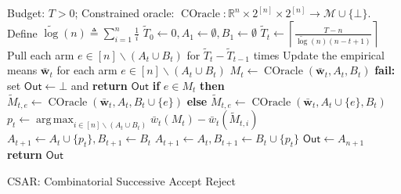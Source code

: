 \documentclass{article}
\newcommand{\AlgorithmBud}{{\small \textsf{CSAR}}\xspace}
\newcommand{\M}{\mathcal M}
\newcommand{\del}{\backslash}
\newcommand{\RR}{\mathbb R}
\DeclareMathOperator*{\argmax}{arg\,max}
\DeclareMathOperator{\COracle}{COracle}
\newcommand{\out}{\mathsf{Out}}
\newcommand{\barlog}{\tilde{\log}}
\renewcommand{\vec}[1]{\boldsymbol{#1}}
\begin{document}
\begin{algorithm}[htbp]
{
\small
\begin{algorithmic}[1]
\Require Budget: $T>0$; Constrained oracle: $\COracle: \RR^n\times 2^{[n]} \times 2^{[n]} \rightarrow \M \cup \{\bot\}$.
\State Define $\barlog(n) \triangleq \sum_{i=1}^n \frac1i$
\State $\tilde T_0 \gets 0, A_1 \gets \emptyset, B_1\gets \emptyset$
	\State $\tilde T_t \gets \left\lceil \frac{T-n}{\barlog(n)(n-t+1)} \right\rceil$
	\State Pull each arm $e\in [n]\del (A_t\cup B_t)$ for $\tilde T_t - \tilde T_{t-1}$ times
	\State Update the empirical means $\vec {\bar w}_t$ for each arm $e\in [n] \del (A_t\cup B_t)$
	\State $M_t \gets \COracle(\vec {\bar w}_t, A_t, B_t)$
    \State \textbf{fail:} set $\out\gets \bot$ and \textbf{return }$\out$
  \EndIf
	\For{\textbf{each} $e \in [n]\del (A_t\cup B_t)$}
		\State \textbf{if } {$e\in M_t$} \textbf{then }  $\tilde M_{t,e} \gets \COracle(\vec {\bar w}_t, A_t, B_t \cup \{e\})$
		\State \textbf{else} $\tilde M_{t,e} \gets \COracle(\vec {\bar w}_t, A_t \cup \{e\}, B_t)$
	\EndFor
	\State $p_t \gets \argmax_{i\in[n]\del (A_t\cup B_t)} \bar w_t(M_t) - \bar w_t(\tilde M_{t,i})$
		\State $A_{t+1} \gets A_t \cup \{p_t\}, B_{t+1} \gets B_t$
	\Else
		\State $A_{t+1} \gets A_t , B_{t+1} \gets B_t \cup \{p_t\}$
	\EndIf
\EndFor
\State $\out\gets A_{n+1}$
\State \textbf{return} $\out$
\end{algorithmic}
\caption{\AlgorithmBud: Combinatorial Successive Accept Reject}
\label{algo:budget}
}
\end{algorithm}
\vspace{-0.8em}
\end{document}
